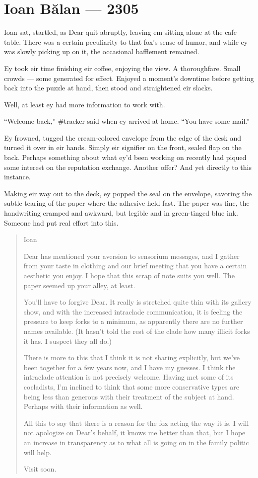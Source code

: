 \hypertarget{ioan-bux103lan-2305}{%
\chapter*{Ioan Bălan — 2305}\label{ioan-bux103lan-2305}}

Ioan sat, startled, as Dear quit abruptly, leaving em sitting alone at the cafe table. There was a certain peculiarity to that fox's sense of humor, and while ey was slowly picking up on it, the occasional bafflement remained.

Ey took eir time finishing eir coffee, enjoying the view. A thoroughfare. Small crowds — some generated for effect. Enjoyed a moment's downtime before getting back into the puzzle at hand, then stood and straightened eir slacks.

Well, at least ey had more information to work with.

``Welcome back,'' \#tracker said when ey arrived at home. ``You have some mail.''

Ey frowned, tugged the cream-colored envelope from the edge of the desk and turned it over in eir hands. Simply eir signifier on the front, sealed flap on the back. Perhaps something about what ey'd been working on recently had piqued some interest on the reputation exchange. Another offer? And yet directly to this instance.

Making eir way out to the deck, ey popped the seal on the envelope, savoring the subtle tearing of the paper where the adhesive held fast. The paper was fine, the handwriting cramped and awkward, but legible and in green-tinged blue ink. Someone had put real effort into this.

\begin{quote}
Ioan

Dear has mentioned your aversion to sensorium messages, and I gather from your taste in clothing and our brief meeting that you have a certain aesthetic you enjoy. I hope that this scrap of note suits you well. The paper seemed up your alley, at least.

You'll have to forgive Dear. It really is stretched quite thin with its gallery show, and with the increased intraclade communication, it is feeling the pressure to keep forks to a minimum, as apparently there are no further names available. (It hasn't told the rest of the clade how many illicit forks it has. I suspect they all do.)

There is more to this that I think it is not sharing explicitly, but we've been together for a few years now, and I have my guesses. I think the intraclade attention is not precisely welcome. Having met some of its cocladists, I'm inclined to think that some more conservative types are being less than generous with their treatment of the subject at hand. Perhaps with their information as well.

All this to say that there is a reason for the fox acting the way it is. I will not apologize on Dear's behalf, it knows me better than that, but I hope an increase in transparency as to what all is going on in the family politic will help.

Visit soon.
\end{quote}

